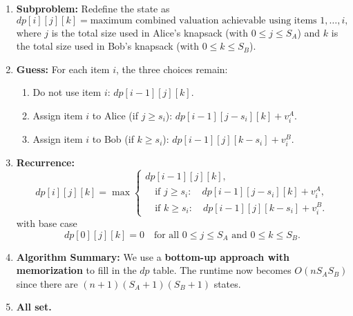 \documentclass[11pt]{article}
\begin{document}
    \begin{enumerate}
        \item \textbf{Subproblem:}  
        Redefine the state as 
        \[
        dp[i][j][k] = \text{maximum combined valuation achievable using items } 1,\dots,i,
        \]
        where \(j\) is the total size used in Alice's knapsack (with \(0\le j\le S_A\)) and \(k\) is the total size used in Bob's knapsack (with \(0\le k\le S_B\)).
        
        \item \textbf{Guess:}  
        For each item \(i\), the three choices remain:
        \begin{enumerate}
            \item Do not use item \(i\): \(dp[i-1][j][k]\).
            \item Assign item \(i\) to Alice (if \(j\ge s_i\)): \(dp[i-1][j-s_i][k] + v_i^A\).
            \item Assign item \(i\) to Bob (if \(k\ge s_i\)): \(dp[i-1][j][k-s_i] + v_i^B\).
        \end{enumerate}
        
        \item \textbf{Recurrence:}  
        \[
        dp[i][j][k] = \max \left\{
        \begin{array}{l}
        dp[i-1][j][k],\\[1mm]
        \quad \text{if } j \ge s_i: \quad dp[i-1][j-s_i][k] + v_i^A,\\[1mm]
        \quad \text{if } k \ge s_i: \quad dp[i-1][j][k-s_i] + v_i^B.
        \end{array}
        \right.
        \]
        with base case 
        \[
        dp[0][j][k] = 0 \quad \text{for all } 0\le j\le S_A \text{ and } 0\le k\le S_B.
        \]
        
        \item \textbf{Algorithm Summary:}  
        We use a \textbf{bottom-up approach with memorization} to fill in the \(dp\) table. The runtime now becomes \(O(nS_A S_B)\) since there are \((n+1)(S_A+1)(S_B+1)\) states.
        
        \item \textbf{All set.}
    \end{enumerate}
    \newpage
\end{document}
